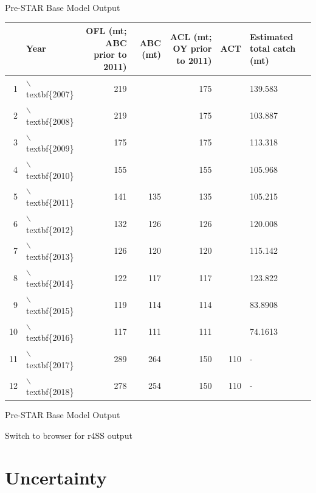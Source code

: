 \documentclass[ignorenonframetext,]{beamer}
\begin{document}
\begin{frame}{Pre-STAR Base Model Output}

\begin{table}[ht]
\centering
\begin{tabular}{rlrrrrl}
  \hline
 & Year & OFL (mt; ABC prior to 2011) & ABC (mt) & ACL (mt; OY prior to 2011) & ACT & Estimated total catch (mt) \\ 
  \hline
1 & $\backslash$textbf\{2007\} & 219 &  & 175 &  & 139.583 \\ 
  2 & $\backslash$textbf\{2008\} & 219 &  & 175 &  & 103.887 \\ 
  3 & $\backslash$textbf\{2009\} & 175 &  & 175 &  & 113.318 \\ 
  4 & $\backslash$textbf\{2010\} & 155 &  & 155 &  & 105.968 \\ 
  5 & $\backslash$textbf\{2011\} & 141 & 135 & 135 &  & 105.215 \\ 
  6 & $\backslash$textbf\{2012\} & 132 & 126 & 126 &  & 120.008 \\ 
  7 & $\backslash$textbf\{2013\} & 126 & 120 & 120 &  & 115.142 \\ 
  8 & $\backslash$textbf\{2014\} & 122 & 117 & 117 &  & 123.822 \\ 
  9 & $\backslash$textbf\{2015\} & 119 & 114 & 114 &  & 83.8908 \\ 
  10 & $\backslash$textbf\{2016\} & 117 & 111 & 111 &  & 74.1613 \\ 
  11 & $\backslash$textbf\{2017\} & 289 & 264 & 150 & 110 & - \\ 
  12 & $\backslash$textbf\{2018\} & 278 & 254 & 150 & 110 & - \\ 
   \hline
\end{tabular}
\end{table}

\end{frame}

\begin{frame}{Pre-STAR Base Model Output}

Switch to browser for r4SS output

\end{frame}

\section{Uncertainty}\label{uncertainty}
\end{document}

